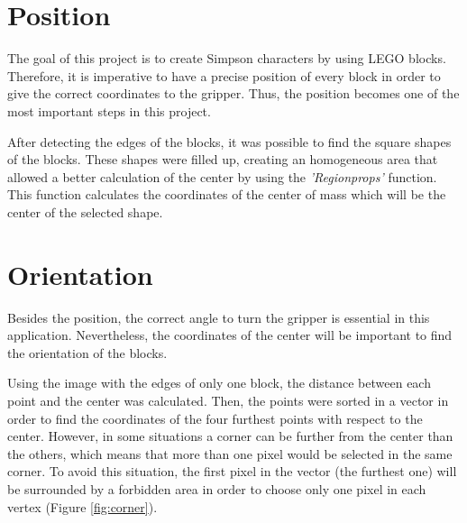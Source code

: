 \section{Position}
The goal of this project is to create Simpson characters by using LEGO blocks. Therefore, it is imperative to have a precise position of every block in order to give the correct coordinates to the gripper. Thus, the position becomes one of the most important steps in this project.

After detecting the edges of the blocks, it was possible to find the square shapes of the blocks. These shapes were filled up, creating an homogeneous area that allowed a better calculation of the center by using the \textit{'Regionprops'} function. This function calculates the coordinates of the center of mass which will be the center of the selected shape.

\section{Orientation}
Besides the position, the correct angle to turn the gripper is essential in this application. Nevertheless, the coordinates of the center will be important to find the orientation of the blocks. 

Using the image with the edges of only one block, the distance between each point and the center was calculated. Then, the points were sorted in a vector in order to find the coordinates of the four furthest points with respect to the center. However, in some situations a corner can be further from the center than the others, which means that more than one pixel would be selected in the same corner. To avoid this situation, the first pixel in the vector (the furthest one) will be surrounded by a forbidden area in order to choose only one pixel in each vertex (Figure \ref{fig:corner}).

